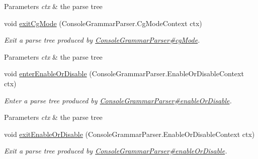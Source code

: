 \begin{DoxyCompactItemize}
\begin{DoxyCompactList}
\begin{DoxyParams}{Parameters}
{\em ctx} & the parse tree\\
\hline
\end{DoxyParams}
 \end{DoxyCompactList}\item 
void \hyperlink{classgov_1_1nasa_1_1jpf_1_1inspector_1_1client_1_1parser_1_1_console_grammar_base_listener_a1468189d9c19cbe5a08e16854ecae7b0}{exit\+Cg\+Mode} (Console\+Grammar\+Parser.\+Cg\+Mode\+Context ctx)
\begin{DoxyCompactList}\small\item\em Exit a parse tree produced by \hyperlink{classgov_1_1nasa_1_1jpf_1_1inspector_1_1client_1_1parser_1_1_console_grammar_parser_af43a448b70b2817dcedfc1f3d360cd42}{Console\+Grammar\+Parser\#cg\+Mode}.


\begin{DoxyParams}{Parameters}
{\em ctx} & the parse tree\\
\hline
\end{DoxyParams}
 \end{DoxyCompactList}\item 
void \hyperlink{classgov_1_1nasa_1_1jpf_1_1inspector_1_1client_1_1parser_1_1_console_grammar_base_listener_ac57193279108f427d71b31cd61f91458}{enter\+Enable\+Or\+Disable} (Console\+Grammar\+Parser.\+Enable\+Or\+Disable\+Context ctx)
\begin{DoxyCompactList}\small\item\em Enter a parse tree produced by \hyperlink{classgov_1_1nasa_1_1jpf_1_1inspector_1_1client_1_1parser_1_1_console_grammar_parser_aa5fa0739c6c5c8346b0476e6f75df5e4}{Console\+Grammar\+Parser\#enable\+Or\+Disable}.


\begin{DoxyParams}{Parameters}
{\em ctx} & the parse tree\\
\hline
\end{DoxyParams}
 \end{DoxyCompactList}\item 
void \hyperlink{classgov_1_1nasa_1_1jpf_1_1inspector_1_1client_1_1parser_1_1_console_grammar_base_listener_a64e4cf5f73042264365bbbf6a46fb1ff}{exit\+Enable\+Or\+Disable} (Console\+Grammar\+Parser.\+Enable\+Or\+Disable\+Context ctx)
\begin{DoxyCompactList}\small\item\em Exit a parse tree produced by \hyperlink{classgov_1_1nasa_1_1jpf_1_1inspector_1_1client_1_1parser_1_1_console_grammar_parser_aa5fa0739c6c5c8346b0476e6f75df5e4}{Console\+Grammar\+Parser\#enable\+Or\+Disable}.



\end{DoxyCompactList}
\end{DoxyCompactItemize}
